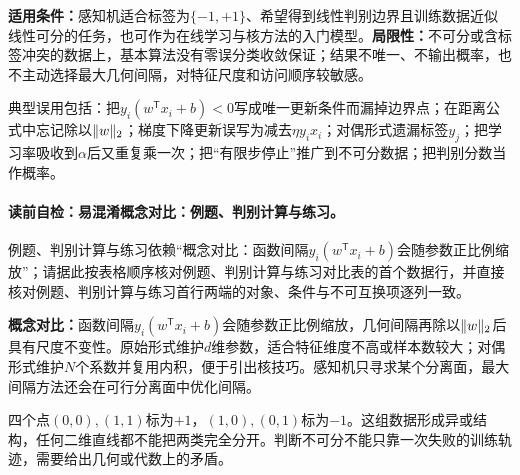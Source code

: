 \label{struct:V2-C01-CH28}
\label{struct:V2-C01-CH29}
\begin{applicabilitybox}
\textbf{适用条件：}感知机适合标签为$\{-1,+1\}$、希望得到线性判别边界且训练数据近似线性可分的任务，也可作为在线学习与核方法的入门模型。\textbf{局限性：}不可分或含标签冲突的数据上，基本算法没有零误分类收敛保证；结果不唯一、不输出概率，也不主动选择最大几何间隔，对特征尺度和访问顺序较敏感。
\end{applicabilitybox}

\label{struct:V2-C01-CH30}
\begin{warningbox}
典型误用包括：把$y_i(w^{\mathsf T}x_i+b)<0$写成唯一更新条件而漏掉边界点；在距离公式中忘记除以$\lVert w\rVert_2$；梯度下降更新误写为减去$\eta y_ix_i$；对偶形式遗漏标签$y_j$；把学习率吸收到$\alpha$后又重复乘一次；把“有限步停止”推广到不可分数据；把判别分数当作概率。
\end{warningbox}

\label{struct:V2-C01-CH31}
\paragraph{读前自检：易混淆概念对比：例题、判别计算与练习。}例题、判别计算与练习依赖“概念对比：函数间隔$y_i(w^{\mathsf T}x_i+b)$会随参数正比例缩放”；请据此按表格顺序核对例题、判别计算与练习对比表的首个数据行，并直接核对例题、判别计算与练习首行两端的对象、条件与不可互换项逐列一致。\par

\begin{comparisonbox}
\textbf{概念对比：}函数间隔$y_i(w^{\mathsf T}x_i+b)$会随参数正比例缩放，几何间隔再除以$\lVert w\rVert_2$后具有尺度不变性。原始形式维护$d$维参数，适合特征维度不高或样本数较大；对偶形式维护$N$个系数并复用内积，便于引出核技巧。感知机只寻求某个分离面，最大间隔方法还会在可行分离面中优化间隔。
\end{comparisonbox}

\label{struct:V2-C01-CH32}
\begin{example}[线性不可分的异或结构]\label{exm:V2-C01-xor}
四个点$(0,0),(1,1)$标为$+1$，$(1,0),(0,1)$标为$-1$。这组数据形成异或结构，任何二维直线都不能把两类完全分开。判断不可分不能只靠一次失败的训练轨迹，需要给出几何或代数上的矛盾。
\end{example}

